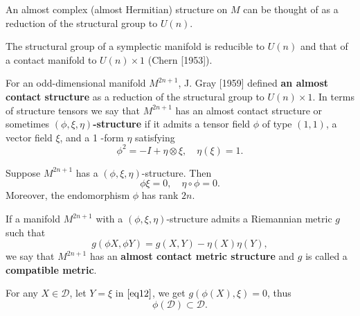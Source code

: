 \begin{remark}
    An almost complex (almost Hermitian) structure on $M$ can be thought of as a reduction of the structural group to $U (n)$.
\end{remark}

\begin{remark}
    The structural group of a symplectic manifold is reducible to $U(n)$ and that of a contact manifold to $U(n) \times 1$ (Chern [1953]). 
\end{remark}
\begin{definition}
        For an odd-dimensional manifold $M^{2 n+1}$, J. Gray [1959] defined \textbf{an almost contact structure} as a reduction of the structural group to $U(n) \times 1$. In terms of structure tensors we say that $M^{2 n+1}$ has an almost contact structure or sometimes \textbf{$(\phi, \xi, \eta)$-structure} if it admits a tensor field $\phi$ of type $(1,1)$, a vector field $\xi$, and a 1 -form $\eta$ satisfying
    \begin{equation}
        \phi^2=-I+\eta \otimes \xi, \quad \eta(\xi)=1 .
    \end{equation}
\end{definition}
\begin{theorem}
    Suppose $M^{2 n+1}$ has a $(\phi, \xi, \eta)$-structure. Then 
    \begin{equation}
        \phi \xi=0, \quad \eta \circ \phi=0.
    \end{equation}
 Moreover, the endomorphism $\phi$ has rank $2 n$.
\end{theorem}

\begin{definition}
    If a manifold $M^{2 n+1}$ with a $(\phi, \xi, \eta)$-structure admits a Riemannian metric $g$ such that
    \begin{equation}\label{eq12}
        g(\phi X, \phi Y)=g(X, Y)-\eta(X) \eta(Y),
    \end{equation}
we say that $M^{2 n+1}$ has an \textbf{almost contact metric structure} and $g$ is called a \textbf{compatible metric}. 
\end{definition}
\begin{remark}
    For any $X\in \mathcal{D}$, let $Y=\xi$ in $\eqref{eq12}$, we get 
    $g(\phi(X),\xi)=0$, thus
    \begin{equation}
        \phi (\mathcal{D}) \subset \mathcal{D}.
    \end{equation}
\end{remark}

